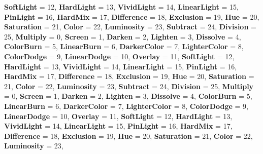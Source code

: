 \begin{DoxyCompactItemize}
{\bfseries Soft\+Light} = 12, 
{\bfseries Hard\+Light} = 13, 
{\bfseries Vivid\+Light} = 14, 
{\bfseries Linear\+Light} = 15, 
\newline
{\bfseries Pin\+Light} = 16, 
{\bfseries Hard\+Mix} = 17, 
{\bfseries Difference} = 18, 
{\bfseries Exclusion} = 19, 
\newline
{\bfseries Hue} = 20, 
{\bfseries Saturation} = 21, 
{\bfseries Color} = 22, 
{\bfseries Luminosity} = 23, 
\newline
{\bfseries Subtract} = 24, 
{\bfseries Division} = 25, 
{\bfseries Multiply} = 0, 
{\bfseries Screen} = 1, 
\newline
{\bfseries Darken} = 2, 
{\bfseries Lighten} = 3, 
{\bfseries Dissolve} = 4, 
{\bfseries Color\+Burn} = 5, 
\newline
{\bfseries Linear\+Burn} = 6, 
{\bfseries Darker\+Color} = 7, 
{\bfseries Lighter\+Color} = 8, 
{\bfseries Color\+Dodge} = 9, 
\newline
{\bfseries Linear\+Dodge} = 10, 
{\bfseries Overlay} = 11, 
{\bfseries Soft\+Light} = 12, 
{\bfseries Hard\+Light} = 13, 
\newline
{\bfseries Vivid\+Light} = 14, 
{\bfseries Linear\+Light} = 15, 
{\bfseries Pin\+Light} = 16, 
{\bfseries Hard\+Mix} = 17, 
\newline
{\bfseries Difference} = 18, 
{\bfseries Exclusion} = 19, 
{\bfseries Hue} = 20, 
{\bfseries Saturation} = 21, 
\newline
{\bfseries Color} = 22, 
{\bfseries Luminosity} = 23, 
{\bfseries Subtract} = 24, 
{\bfseries Division} = 25, 
\newline
{\bfseries Multiply} = 0, 
{\bfseries Screen} = 1, 
{\bfseries Darken} = 2, 
{\bfseries Lighten} = 3, 
\newline
{\bfseries Dissolve} = 4, 
{\bfseries Color\+Burn} = 5, 
{\bfseries Linear\+Burn} = 6, 
{\bfseries Darker\+Color} = 7, 
\newline
{\bfseries Lighter\+Color} = 8, 
{\bfseries Color\+Dodge} = 9, 
{\bfseries Linear\+Dodge} = 10, 
{\bfseries Overlay} = 11, 
\newline
{\bfseries Soft\+Light} = 12, 
{\bfseries Hard\+Light} = 13, 
{\bfseries Vivid\+Light} = 14, 
{\bfseries Linear\+Light} = 15, 
\newline
{\bfseries Pin\+Light} = 16, 
{\bfseries Hard\+Mix} = 17, 
{\bfseries Difference} = 18, 
{\bfseries Exclusion} = 19, 
\newline
{\bfseries Hue} = 20, 
{\bfseries Saturation} = 21, 
{\bfseries Color} = 22, 
{\bfseries Luminosity} = 23, 

\end{DoxyCompactItemize}
